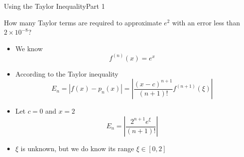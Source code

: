 \documentclass[10pt]{beamer}
\begin{document}



\begin{frame}{Using the Taylor Inequality}{Part 1}
\begin{example}
How many Taylor terms are required to approximate $e^2$ with an error less than $2 \times 10^{-8}$?
\end{example}

\begin{itemize}
    \item We know 
        $$f^{(n)}(x) = e^x$$
    \item According to the Taylor inequality 
        $$E_n = |f(x) - p_n(x)| =\left|\frac{(x-c)^{n+1}}{(n+1)!}f^{(n+1)}(\xi)\right| $$
    \item Let $c=0$ and $x=2$
        $$E_n = \left|\frac{2^{n+1}e^\xi}{(n+1)!}\right|$$
    \item $\xi$ is unknown, but we do know its range $\xi\in[0,2]$ 
\end{itemize}
\end{frame}
\end{document}
